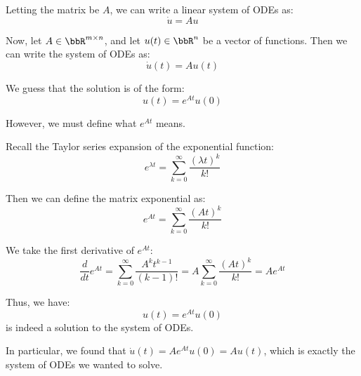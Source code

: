 Letting the matrix be $A$, we can write a linear system of ODEs as:
\[
\boxed{
\dot{u} = A u
}
\]


Now, let $A \in \bbR^{m \times n}$, and let $u(t) \in \bbR^n$ be a vector of functions. Then we can write the system of ODEs as:
\begin{equation*}
\dot{u}(t) = A u(t)
\end{equation*}

We guess that the solution is of the form:
\begin{equation*}
u(t) = e^{At} u(0)
\end{equation*}

However, we must define what $e^{At}$ means.

Recall the Taylor series expansion of the exponential function:
\begin{equation*}
e^{\lambda t} = \sum_{k=0}^{\infty} \frac{(\lambda t)^k}{k!}
\end{equation*}

Then we can define the matrix exponential as:
\begin{equation*}
e^{At} = \sum_{k=0}^{\infty} \frac{(At)^k}{k!}
\end{equation*}

We take the first derivative of $e^{At}$:
\begin{equation*}
\frac{d}{dt} e^{At} = \sum_{k=0}^{\infty} \frac{A^k t^{k-1}}{(k-1)!} = A \sum_{k=0}^{\infty} \frac{(At)^k}{k!} = A e^{At}
\end{equation*}

Thus, we have:
\begin{equation*}
u(t) = e^{At} u(0)
\end{equation*}
is indeed a solution to the system of ODEs.

In particular, we found that $\dot{u}(t) = A e^{At} u(0) = A u(t)$, which is exactly the system of ODEs we wanted to solve.

